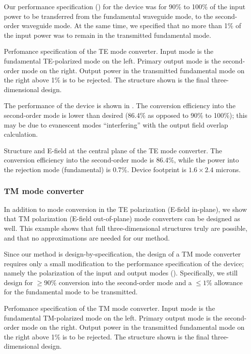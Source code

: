 \documentclass[letterpaper,10pt]{article}
\begin{document}
Our performance specification () 
    for the device was for 90\% to 100\% of the 
    input power to be transferred from the fundamental waveguide mode,
    to the second-order waveguide mode.
At the same time, we specified that no more than 1\% of the input power
    was to remain in the transmitted fundamental mode.

    {Perfomance specification of the TE mode converter.
    Input mode is the fundamental TE-polarized mode on the left.
    Primary output mode is the second-order mode on the right.
    Output power in the transmitted fundamental mode on the right 
    above 1\% is to be rejected.
    The structure shown is the final three-dimensional design.
    }

The performance of the device is shown in .
The conversion efficiency into the second-order mode is lower
    than desired (86.4\% as opposed to 90\% to 100\%);
    this may be due to evanescent modes ``interfering'' 
    with the output field overlap calculation.

    {Structure and E-field at the central plane of the TE mode converter.
    The conversion efficiency into the second-order mode is 86.4\%,
    while the power into the rejection mode (fundamental) is 0.7\%.
    Device footprint is $1.6\times2.4$ microns.}


\subsubsection{TM mode converter}

In addition to mode conversion in the TE polarization (E-field in-plane),
    we show that TM polarization (E-field out-of-plane) mode converters
    can be designed as well.
This example shows that full three-dimensional structures 
    truly are possible,
    and that no approximations are needed for our method.

Since our method is design-by-specification, 
    the design of a TM mode converter requires only
    a small modification to the performance specification of the device;
    namely the polarization of the input and output modes ().
Specifically, we still design for 
    $\ge 90\%$ conversion into the second-order mode and 
    a $\le 1\%$ allowance for the fundamental mode to be transmitted.

    {Perfomance specification of the TM mode converter.
    Input mode is the fundamental TM-polarized mode on the left.
    Primary output mode is the second-order mode on the right.
    Output power in the transmitted fundamental mode on the right 
    above 1\% is to be rejected.
    The structure shown is the final three-dimensional design.}
    
\end{document}
